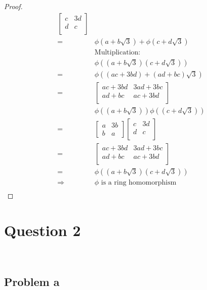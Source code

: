 \documentclass{article}
\begin{document}
\begin{proof}
\begin{align*}
\begin{bmatrix}
            c&3d\\
            d&c\\
        \end{bmatrix}\\
        =&\phi(a+b\sqrt{3})+\phi(c+d\sqrt{3})\\
        &\text{Multiplication}:\\
        &\phi((a+b\sqrt{3})(c+d\sqrt{3}))\\
        =&\phi((ac+3bd)+(ad+bc)\sqrt{3})\\
        =&\begin{bmatrix}
            ac+3bd&3ad+3bc\\
            ad+bc&ac+3bd\\
        \end{bmatrix}\\
        &\phi((a+b\sqrt{3}))\phi((c+d\sqrt{3}))\\
        =&\begin{bmatrix}
            a&3b\\
            b&a
        \end{bmatrix}\begin{bmatrix}
            c&3d\\
            d&c\\
        \end{bmatrix}\\
        =&\begin{bmatrix}
            ac+3bd&3ad+3bc\\
            ad+bc&ac+3bd\\
        \end{bmatrix}\\
        =&\phi((a+b\sqrt{3})(c+d\sqrt{3}))\\
        \Rightarrow&\phi\text{ is a ring homomorphism}\\
    \end{align*}
\end{proof}

\newpage

\section*{Question 2}

~

\subsection*{Problem a}
\end{document}
